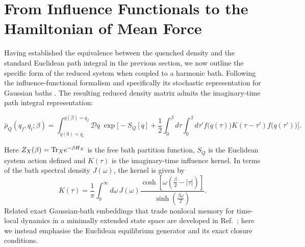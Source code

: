 \section{\label{sec:influence_to_hmf}From Influence Functionals to the Hamiltonian of Mean Force}
Having established the equivalence between the quenched density and the standard Euclidean path integral in the previous section, we now outline the specific form of the reduced system when coupled to a harmonic bath. Following the influence-functional formalism \cite{feynmanTheoryGeneralQuantum1963a,caldeiraQuantumTunnellingDissipative1983a,grabertQuantumBrownianMotion1988} and specifically its stochastic representation for Gaussian baths \cite{mccaulPartitionfreeApproachOpen2017c, mccaulDrivingSpinbosonModels2018a, mccaulHowWinFriends2021b}. The resulting reduced density matrix admits the imaginary-time path integral representation:
\begin{widetext}
\begin{equation}
    \bar\rho_Q(q_f,q_i;\beta) = \int_{q(0)=q_i}^{q(\beta)=q_f}\!\!\mathcal D q\; \exp\Bigg[ -S_Q[q] + \frac{1}{2}\int_0^\beta d\tau\int_0^\beta d\tau' f\big(q(\tau)\big) K(\tau-\tau') f\big(q(\tau')\big) \Bigg].
    \label{eq:reduced_effective_PI}
\end{equation}
\end{widetext}
Here $Z_X(\beta)=\mathrm{Tr}_X e^{-\beta H_X}$ is the free bath partition function, $S_Q$ is the Euclidean system action defined and $K(\tau)$ is the imaginary-time influence kernel. In terms of the bath spectral density $J(\omega)$, the kernel is given by~\cite{weissQuantumDissipativeSystems2012, feynmanTheoryGeneralQuantum1963a}
\begin{equation}
    K(\tau) = \frac{1}{\pi}\int_0^\infty d\omega\, J(\omega) \frac{\cosh\!\left[\omega\left(\frac{\beta}{2}-|\tau|\right)\right]} {\sinh\!\left(\frac{\beta\omega}{2}\right)}.
    \label{eq:kernel_spectral}
\end{equation}
Related exact Gaussian-bath embeddings that trade nonlocal memory for time-local dynamics in a minimally extended state space are developed in Ref.~\cite{XuAnkerholdEPJST2025}; here we instead emphasise the Euclidean equilibrium generator and its exact closure conditions.

